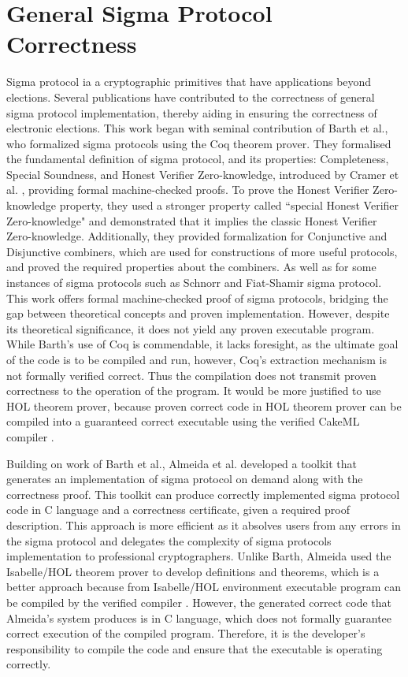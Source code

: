 \section{General Sigma Protocol Correctness}
Sigma protocol ia a cryptographic primitives that have applications beyond elections. Several publications have contributed to the correctness of general sigma protocol implementation, thereby aiding in ensuring the correctness of electronic elections. This work began with seminal contribution of Barth et al.\cite{Barthe2010AMF}, who formalized sigma protocols using the Coq theorem prover. They formalised the fundamental definition of sigma protocol, and its properties: Completeness, Special Soundness, and Honest Verifier Zero-knowledge, introduced by Cramer et al. \cite{Cramer1997ModularDO}, providing formal machine-checked proofs. To prove the Honest Verifier Zero-knowledge property, they used a stronger property called ``special Honest Verifier Zero-knowledge" and demonstrated that it implies the classic Honest Verifier Zero-knowledge. Additionally, they provided formalization for Conjunctive and Disjunctive combiners, which are used for constructions of more useful protocols, and proved the required properties about the combiners. As well as for some instances of sigma protocols such as Schnorr and Fiat-Shamir sigma protocol. This work offers formal machine-checked proof of sigma protocols, bridging the gap between theoretical concepts and proven implementation. However, despite its theoretical significance, it does not yield any proven executable program. While Barth's use of Coq is commendable, it lacks foresight, as the ultimate goal of the code is to be compiled and run, however, Coq's extraction mechanism is not formally verified correct. Thus the compilation does not transmit proven correctness to the operation of the program. It would be more justified to use HOL theorem prover, because proven correct code in HOL theorem prover can be compiled into a guaranteed correct executable using the verified CakeML compiler \cite{Tan2016ANV, Kumar2015ProofgroundedBO}.

Building on work of Barth et al.\cite{Barthe2010AMF}, Almeida et al. \cite{Almeida2010ACC} developed a toolkit that generates an implementation of sigma protocol on demand along with the correctness proof. This toolkit can produce correctly implemented sigma protocol code in C language and a correctness certificate, given a required proof description. This approach is more efficient as it absolves users from any errors in the sigma protocol and delegates the complexity of sigma protocols implementation to professional cryptographers. Unlike Barth, Almeida used the Isabelle/HOL theorem prover to develop definitions and theorems, which is a better approach because from Isabelle/HOL environment executable program can be compiled by the verified compiler \cite{Hupel2018AVC}. However, the generated correct code that Almeida's system produces is in C language, which does not formally guarantee correct execution of the compiled program. Therefore, it is the developer's responsibility to compile the code and ensure that the executable is operating correctly.


